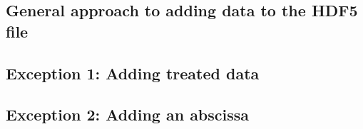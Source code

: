 

\subsection{General approach to adding data to the HDF5 file}
    \nopagebreak
    

\subsection{Exception 1: Adding treated data}
    

\subsection{Exception 2: Adding an abscissa}
    